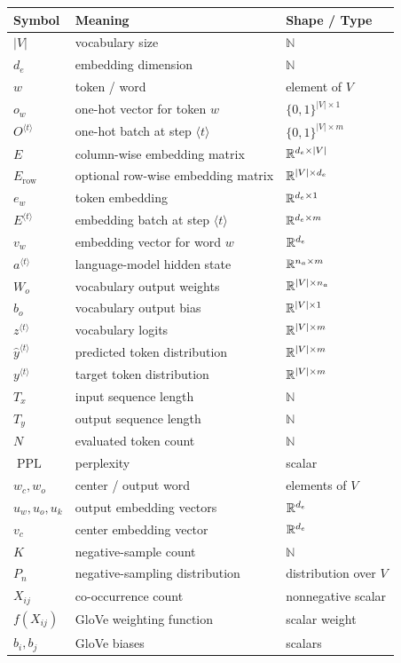 \begin{center}
\begin{tabular}{lll}
\toprule
Symbol & Meaning & Shape / Type \\
\midrule
$\lvert V\rvert$ & vocabulary size & $\mathbb{N}$ \\
$d_e$ & embedding dimension & $\mathbb{N}$ \\
$w$ & token / word & element of $V$ \\
$o_w$ & one-hot vector for token $w$ & $\{0,1\}^{\lvert V\rvert \times 1}$ \\
$O^{\langle t\rangle}$ & one-hot batch at step $\langle t\rangle$ & $\{0,1\}^{\lvert V\rvert \times m}$ \\
$E$ & column-wise embedding matrix & $\mathbb{R}^{d_e \times \lvert V\rvert}$ \\
$E_{\mathrm{row}}$ & optional row-wise embedding matrix & $\mathbb{R}^{\lvert V\rvert \times d_e}$ \\
$e_w$ & token embedding & $\mathbb{R}^{d_e \times 1}$ \\
$E^{\langle t\rangle}$ & embedding batch at step $\langle t\rangle$ & $\mathbb{R}^{d_e \times m}$ \\
$v_w$ & embedding vector for word $w$ & $\mathbb{R}^{d_e}$ \\
$a^{\langle t\rangle}$ & language-model hidden state & $\mathbb{R}^{n_a \times m}$ \\
$W_o$ & vocabulary output weights & $\mathbb{R}^{\lvert V\rvert \times n_a}$ \\
$b_o$ & vocabulary output bias & $\mathbb{R}^{\lvert V\rvert \times 1}$ \\
$z^{\langle t\rangle}$ & vocabulary logits & $\mathbb{R}^{\lvert V\rvert \times m}$ \\
$\hat{y}^{\langle t\rangle}$ & predicted token distribution & $\mathbb{R}^{\lvert V\rvert \times m}$ \\
$y^{\langle t\rangle}$ & target token distribution & $\mathbb{R}^{\lvert V\rvert \times m}$ \\
$T_x$ & input sequence length & $\mathbb{N}$ \\
$T_y$ & output sequence length & $\mathbb{N}$ \\
$N$ & evaluated token count & $\mathbb{N}$ \\
$\operatorname{PPL}$ & perplexity & scalar \\
$w_c,w_o$ & center / output word & elements of $V$ \\
$u_w,u_o,u_k$ & output embedding vectors & $\mathbb{R}^{d_e}$ \\
$v_c$ & center embedding vector & $\mathbb{R}^{d_e}$ \\
$K$ & negative-sample count & $\mathbb{N}$ \\
$P_n$ & negative-sampling distribution & distribution over $V$ \\
$X_{ij}$ & co-occurrence count & nonnegative scalar \\
$f(X_{ij})$ & GloVe weighting function & scalar weight \\
$b_i,b_j$ & GloVe biases & scalars \\
\bottomrule
\end{tabular}
\end{center}

